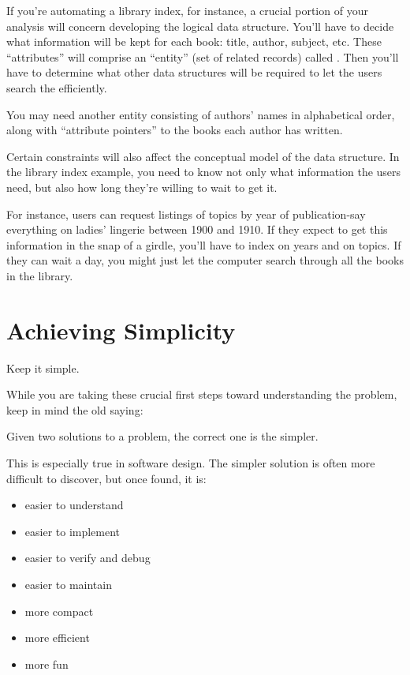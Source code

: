 If you're automating a library index, for instance, a crucial portion
of your analysis will concern developing the logical data structure. You'll
have to decide what information will be kept for each book: title, author,
subject, etc. These ``attributes'' will comprise an ``entity'' (set of related
records) called . Then you'll have to determine what other data
structures will be required to let the users search the  efficiently.




You may need another entity consisting of authors' names in
alphabetical order, along with ``attribute pointers'' to the books each author has
written.

Certain constraints will also affect the conceptual model of the data
structure. In the library index example, you need to know not only what
information the users need, but also how long they're willing to wait to
get it.

For instance, users can request listings of topics by year of
publication-say everything on ladies' lingerie between 1900 and 1910. If they
expect to get this information in the snap of a girdle, you'll have to index
on years and on topics. If they can wait a day, you might just let the
computer search through all the books in the library.

\section{Achieving Simplicity}

\begin{tip}
Keep it simple.
\end{tip}

\noindent While you are taking these crucial first steps toward understanding the
problem, keep in mind the old saying:

\begin{tfquot}
\noindent Given two solutions to a problem, the correct one is the simpler.
\end{tfquot}

\noindent This is especially true in software design. The simpler solution is often
more difficult to discover, but once found, it is:

\begin{itemize}
\item easier to understand
\item easier to implement
\item easier to verify and debug
\item easier to maintain
\item more compact
\item more efficient
\item more fun
\end{itemize}

